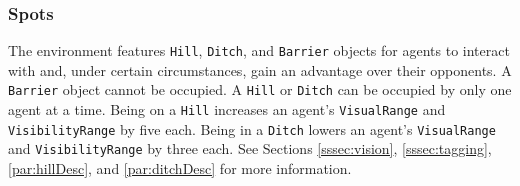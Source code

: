 \documentclass[
  a4paper,
  english,
  DIV=16,
  11pt,
  parskip=half,
  dvipsnames,
  listof=totoc,		     %
  index=totoc,		     %
  bibliography=totoc,	 %
]{scrartcl}
\begin{document}
\subsubsection{Spots} \label{sssec:spot}
The environment features \texttt{Hill}, \texttt{Ditch}, and \texttt{Barrier} objects for agents to interact with and, under certain circumstances, gain an advantage over their opponents. A \texttt{Barrier} object cannot be occupied. A \texttt{Hill} or \texttt{Ditch} can be occupied by only one agent at a time. Being on a \texttt{Hill} increases an agent's \texttt{VisualRange} and \texttt{VisibilityRange} by five each. Being in a \texttt{Ditch} lowers an agent's \texttt{VisualRange} and  \texttt{VisibilityRange} by three each. See Sections \ref{sssec:vision}, \ref{sssec:tagging}, \ref{par:hillDesc}, and \ref{par:ditchDesc} for more information.
\end{document}
